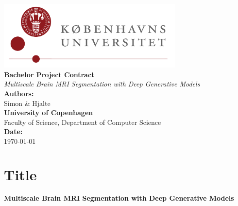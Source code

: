 \documentclass[12pt]{report}
\newcommand{\universitylogo}{\includegraphics[width=0.7\textwidth]{images/ku_logo_dk_hh.png}}
\begin{document}
\begin{titlepage}
  \begin{center}
      \universitylogo \\[1.5cm] %
      {\Huge \textbf{Bachelor Project Contract}} \\[0.8cm]
      {\Large \textit{Multiscale Brain MRI Segmentation with Deep Generative Models}} \\[2cm]
      {\Large \textbf{Authors:}} \\
      Simon \& Hjalte \\[1.5cm]
      {\Large \textbf{University of Copenhagen}} \\[0.5cm]
      {\Large Faculty of Science, Department of Computer Science} \\[1.5cm]
      {\Large \textbf{Date:}} \\
      \today
  \end{center}
  \vfill
\end{titlepage}

\pagestyle{fancy} %

\section*{Title}
\textbf{Multiscale Brain MRI Segmentation with Deep Generative Models}
\end{document}
